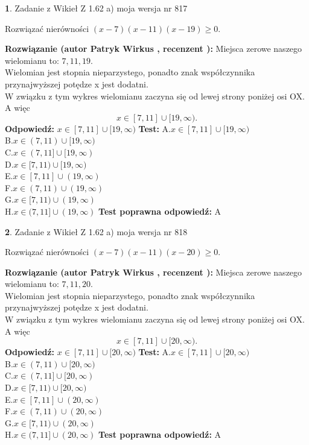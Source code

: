 \documentclass[12pt, a4paper]{article}
\theoremstyle{definition} %
\newtheorem{zad}{}
\newcommand{\zadStart}[1]{\begin{zad}#1\newline}
\newcommand{\zadStop}{\end{zad}}
\newcommand{\rozwStart}[2]{\noindent \textbf{Rozwiązanie (autor #1 , recenzent #2): }\newline}
\newcommand{\rozwStop}{\newline}
\newcommand{\odpStart}{\noindent \textbf{Odpowiedź:}\newline}
\newcommand{\odpStop}{\newline}
\newcommand{\testStart}{\noindent \textbf{Test:}\newline}
\newcommand{\testStop}{\newline}
\newcommand{\kluczStart}{\noindent \textbf{Test poprawna odpowiedź:}\newline}
\newcommand{\kluczStop}{\newline}
\begin{document}
\zadStart{Zadanie z Wikieł Z 1.62 a) moja wersja nr 817}

Rozwiązać nierówności $(x-7)(x-11)(x-19)\ge0$.
\zadStop
\rozwStart{Patryk Wirkus}{}
Miejsca zerowe naszego wielomianu to: $7, 11, 19$.\\
Wielomian jest stopnia nieparzystego, ponadto znak współczynnika przy\linebreak najwyższej potędze x jest dodatni.\\ W związku z tym wykres wielomianu zaczyna się od lewej strony poniżej osi OX. A więc $$x \in [7,11] \cup [19,\infty).$$
\rozwStop
\odpStart
$x \in [7,11] \cup [19,\infty)$
\odpStop
\testStart
A.$x \in [7,11] \cup [19,\infty)$\\
B.$x \in (7,11) \cup [19,\infty)$\\
C.$x \in (7,11] \cup [19,\infty)$\\
D.$x \in [7,11) \cup [19,\infty)$\\
E.$x \in [7,11] \cup (19,\infty)$\\
F.$x \in (7,11) \cup (19,\infty)$\\
G.$x \in [7,11) \cup (19,\infty)$\\
H.$x \in (7,11] \cup (19,\infty)$
\testStop
\kluczStart
A
\kluczStop



\zadStart{Zadanie z Wikieł Z 1.62 a) moja wersja nr 818}

Rozwiązać nierówności $(x-7)(x-11)(x-20)\ge0$.
\zadStop
\rozwStart{Patryk Wirkus}{}
Miejsca zerowe naszego wielomianu to: $7, 11, 20$.\\
Wielomian jest stopnia nieparzystego, ponadto znak współczynnika przy\linebreak najwyższej potędze x jest dodatni.\\ W związku z tym wykres wielomianu zaczyna się od lewej strony poniżej osi OX. A więc $$x \in [7,11] \cup [20,\infty).$$
\rozwStop
\odpStart
$x \in [7,11] \cup [20,\infty)$
\odpStop
\testStart
A.$x \in [7,11] \cup [20,\infty)$\\
B.$x \in (7,11) \cup [20,\infty)$\\
C.$x \in (7,11] \cup [20,\infty)$\\
D.$x \in [7,11) \cup [20,\infty)$\\
E.$x \in [7,11] \cup (20,\infty)$\\
F.$x \in (7,11) \cup (20,\infty)$\\
G.$x \in [7,11) \cup (20,\infty)$\\
H.$x \in (7,11] \cup (20,\infty)$
\testStop
\kluczStart
A
\kluczStop
\end{document}

